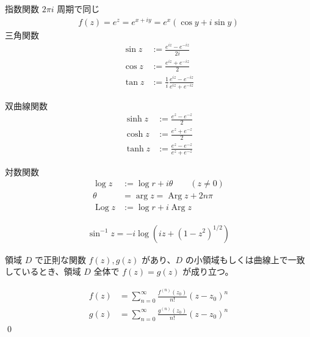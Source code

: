 \documentclass[uplatex,dvipdfmx,a4paper,11pt]{jlreq}
\makeatletter
\DeclareMathOperator{\Log}{Log}
\DeclareMathOperator{\Arg}{Arg}
\theoremstyle{definition}
\renewenvironment{proof}[1][\proofname]{\par
  \normalfont
  \topsep6\p@\@plus6\p@ \trivlist
  \item[\hskip\labelsep{\bfseries #1}\@addpunct{\bfseries}]\ignorespaces\quad\par
}{%
  \qed\endtrivlist\@endpefalse
}
\renewcommand\proofname{証明}
\makeatother
\begin{document}
\begin{definition}[初等関数]
  指数関数 $2\pi i$ 周期で同じ
  \begin{align}
    f(z) = e^z = e^{x + iy} = e^x(\cos y + i\sin y)
  \end{align}
  三角関数
  \begin{align}
    \sin z & := \frac{e^{iz} - e^{-iz}}{2i}                          \\
    \cos z & := \frac{e^{iz} + e^{-iz}}{2}                           \\
    \tan z & := \frac{1}{i}\frac{e^{iz} - e^{-iz}}{e^{iz} + e^{-iz}}
  \end{align}

  双曲線関数
  \begin{align}
    \sinh z & := \frac{e^{z} - e^{-z}}{2}              \\
    \cosh z & := \frac{e^{z} + e^{-z}}{2}              \\
    \tanh z & := \frac{e^{z} - e^{-z}}{e^{z} + e^{-z}}
  \end{align}

  対数関数
  \begin{align}
    \log z & := \log r + i\theta \qquad (z\neq 0) \\
    \theta & = \arg z = \Arg z + 2n\pi            \\
    \Log z & := \log r + i\Arg z
  \end{align}
\end{definition}
\begin{proposition}
  \begin{align}
    \sin^{-1} z = -i\log(iz + (1 - z^2)^{1/2})
  \end{align}
\end{proposition}

\begin{theorem}[一致の定理]
  領域 $D$ で正則な関数 $f(z), g(z)$ があり、$D$ の小領域もしくは曲線上で一致しているとき、領域 $D$ 全体で $f(z) = g(z)$ が成り立つ。
\end{theorem}
\begin{proof}
  \begin{align}
    f(z) & = \sum_{n=0}^{\infty}\frac{f^{(n)}(z_0)}{n!}(z - z_0)^n \\
    g(z) & = \sum_{n=0}^{\infty}\frac{g^{(n)}(z_0)}{n!}(z - z_0)^n
  \end{align}
\end{proof}
\begin{theorem}[解析接続]
\end{theorem}
\end{document}
